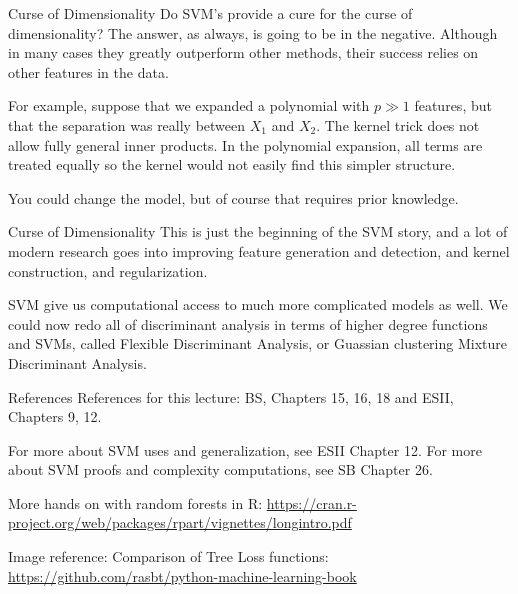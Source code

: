 \documentclass[10pt, table, dvipsnames,xcdraw]{beamer}
\begin{document}
\begin{frame}[fragile]{Curse of Dimensionality}
Do SVM's provide a cure for the curse of dimensionality? The answer, as always, is going to be in the negative. Although in many cases they greatly outperform  other methods, their success relies on other features in the data. \pause 

For example, suppose that we expanded a polynomial with $p\gg1$ features, but that the separation was really between $X_1$ and $X_2$. The kernel trick does not allow fully general inner products. In the polynomial expansion, all terms are treated equally so the kernel would not easily find this simpler structure. 

\pause You could change the model, but of course that requires prior knowledge. 
\end{frame}


\begin{frame}[fragile]{Curse of Dimensionality}
This is just the beginning of the SVM story, and a lot of modern research goes into improving feature generation and detection, and kernel construction, and regularization. \pause 


SVM give us computational access to much more complicated models as well. We could now redo all of discriminant analysis in terms of higher degree functions and SVMs, called Flexible Discriminant Analysis, or Guassian clustering Mixture Discriminant Analysis. 
\end{frame}



\begin{frame}[fragile]{References}
References for this lecture: BS, Chapters 15, 16, 18 and ESII, Chapters 9, 12.  

For more about SVM uses and generalization, see ESII Chapter 12. For more about SVM proofs and complexity computations, see SB Chapter 26. 

More hands on with random forests in R: \url{https://cran.r-project.org/web/packages/rpart/vignettes/longintro.pdf}

Image reference:
Comparison of Tree Loss functions: \url{https://github.com/rasbt/python-machine-learning-book}
\end{frame}
\end{document}
